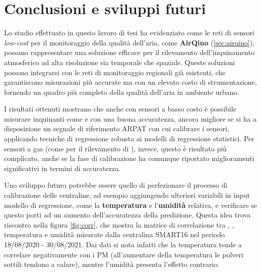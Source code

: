 \chapter*{Conclusioni e sviluppi futuri}\label{ch:conclusioni}
Lo studio effettuato in questo lavoro di tesi ha evidenziato come le reti di sensori \textit{low-cost} per il monitoraggio della qualità dell'aria, come \textbf{AirQino} (\ref{sec:airqino}), possano rappresentare una soluzione efficace per il rilevamento dell'inquinamento atmosferico ad alta risoluzione sia temporale che spaziale. Queste soluzioni possono integrarsi con le reti di monitoraggio regionali già esistenti, che garantiscono misurazioni più accurate ma con un elevato costo di strumentazione, fornendo un quadro più completo della qualità dell'aria in ambiente urbano.

I risultati ottenuti mostrano che anche con sensori a basso costo è possibile misurare inquinanti come  e  con una buona accuratezza, ancora migliore se si ha a disposizione un segnale di riferimento ARPAT con cui calibrare i sensori, applicando tecniche di regressione robusta ai modelli di regressione statistici. Per sensori a gas (come per il rilevamento di ), invece, questo è risultato più complicato, anche se la fase di calibrazione ha comunque riportato miglioramenti significativi in termini di accuratezza.

Uno sviluppo futuro potrebbe essere quello di perfezionare il processo di calibrazione delle centraline, ad esempio aggiungendo ulteriori variabili in input modello di regressione, come la \textbf{temperatura} e l'\textbf{umidità} relativa, e verificare se questo porti ad un aumento dell'accuratezza della predizione.
 Questa idea trova riscontro nella figura \ref{fig:corr}, che mostra la matrice di correlazione tra , , temperatura e umidità misurate dalla centralina SMART16 nel periodo 18/08/2020 - 30/08/2021. Dai dati si nota infatti che la temperatura tende a correlare negativamente con i PM (all'aumentare della temperatura  le polveri sottili tendono a calare), mentre l'umidità presenta l'effetto contrario.
		
